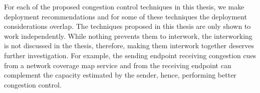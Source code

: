 





For each of the proposed congestion control techniques in this thesis, we make
deployment recommendations and for some of these techniques the deployment
considerations overlap. The techniques proposed in this thesis are only shown
to work independently. While nothing prevents them to interwork, the
interworking is not discussed in the thesis, therefore, making them interwork
together deserves further investigation. For example, the sending endpoint
receiving congestion cues from a network coverage map service and from the
receiving endpoint can complement the capacity estimated by the sender, hence,
performing better congestion control.

